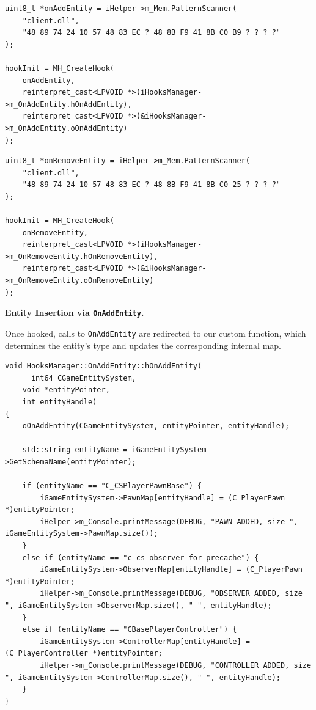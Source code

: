 \begin{lstlisting}[style=cppstyle, caption={Installing the OnAddEntity Hook}]
uint8_t *onAddEntity = iHelper->m_Mem.PatternScanner(
    "client.dll", 
    "48 89 74 24 10 57 48 83 EC ? 48 8B F9 41 8B C0 B9 ? ? ? ?"
);

hookInit = MH_CreateHook(
    onAddEntity,
    reinterpret_cast<LPVOID *>(iHooksManager->m_OnAddEntity.hOnAddEntity),
    reinterpret_cast<LPVOID *>(&iHooksManager->m_OnAddEntity.oOnAddEntity)
);
\end{lstlisting}

\begin{lstlisting}[style=cppstyle, caption={Installing the OnRemoveEntity Hook}]
uint8_t *onRemoveEntity = iHelper->m_Mem.PatternScanner(
    "client.dll", 
    "48 89 74 24 10 57 48 83 EC ? 48 8B F9 41 8B C0 25 ? ? ? ?"
);

hookInit = MH_CreateHook(
    onRemoveEntity,
    reinterpret_cast<LPVOID *>(iHooksManager->m_OnRemoveEntity.hOnRemoveEntity),
    reinterpret_cast<LPVOID *>(&iHooksManager->m_OnRemoveEntity.oOnRemoveEntity)
);
\end{lstlisting}

\newpage

\noindent\textbf{Entity Insertion via \texttt{OnAddEntity}.}

Once hooked, calls to \texttt{OnAddEntity} are redirected to our custom function, which determines the entity’s type and updates the corresponding internal map.

\begin{lstlisting}[style=cppstyle, caption={Hook Implementation: Tracking Entity Creation}]
void HooksManager::OnAddEntity::hOnAddEntity(
    __int64 CGameEntitySystem, 
    void *entityPointer, 
    int entityHandle)
{
    oOnAddEntity(CGameEntitySystem, entityPointer, entityHandle);

    std::string entityName = iGameEntitySystem->GetSchemaName(entityPointer);

    if (entityName == "C_CSPlayerPawnBase") {
        iGameEntitySystem->PawnMap[entityHandle] = (C_PlayerPawn *)entityPointer;
        iHelper->m_Console.printMessage(DEBUG, "PAWN ADDED, size ", iGameEntitySystem->PawnMap.size());
    }
    else if (entityName == "c_cs_observer_for_precache") {
        iGameEntitySystem->ObserverMap[entityHandle] = (C_PlayerPawn *)entityPointer;
        iHelper->m_Console.printMessage(DEBUG, "OBSERVER ADDED, size ", iGameEntitySystem->ObserverMap.size(), " ", entityHandle);
    }
    else if (entityName == "CBasePlayerController") {
        iGameEntitySystem->ControllerMap[entityHandle] = (C_PlayerController *)entityPointer;
        iHelper->m_Console.printMessage(DEBUG, "CONTROLLER ADDED, size ", iGameEntitySystem->ControllerMap.size(), " ", entityHandle);
    }
}
\end{lstlisting}

